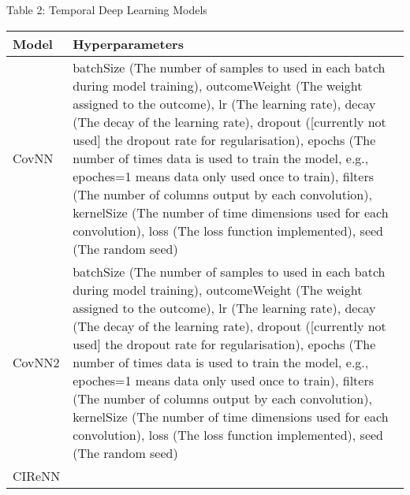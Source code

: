 \documentclass[]{article}
\begin{document}
Table 2: Temporal Deep Learning Models

\begin{longtable}[]{@{}ll@{}}
\toprule
\begin{minipage}[b]{0.12\columnwidth}\raggedright\strut
Model\strut
\end{minipage} & \begin{minipage}[b]{0.82\columnwidth}\raggedright\strut
Hyperparameters\strut
\end{minipage}\tabularnewline
\midrule
\endhead
\begin{minipage}[t]{0.12\columnwidth}\raggedright\strut
CovNN\strut
\end{minipage} & \begin{minipage}[t]{0.82\columnwidth}\raggedright\strut
batchSize (The number of samples to used in each batch during model
training), outcomeWeight (The weight assigned to the outcome), lr (The
learning rate), decay (The decay of the learning rate), dropout
({[}currently not used{]} the dropout rate for regularisation), epochs
(The number of times data is used to train the model, e.g., epoches=1
means data only used once to train), filters (The number of columns
output by each convolution), kernelSize (The number of time dimensions
used for each convolution), loss (The loss function implemented), seed
(The random seed)\strut
\end{minipage}\tabularnewline
\begin{minipage}[t]{0.12\columnwidth}\raggedright\strut
CovNN2\strut
\end{minipage} & \begin{minipage}[t]{0.82\columnwidth}\raggedright\strut
batchSize (The number of samples to used in each batch during model
training), outcomeWeight (The weight assigned to the outcome), lr (The
learning rate), decay (The decay of the learning rate), dropout
({[}currently not used{]} the dropout rate for regularisation), epochs
(The number of times data is used to train the model, e.g., epoches=1
means data only used once to train), filters (The number of columns
output by each convolution), kernelSize (The number of time dimensions
used for each convolution), loss (The loss function implemented), seed
(The random seed)\strut
\end{minipage}\tabularnewline
\begin{minipage}[t]{0.12\columnwidth}\raggedright\strut
CIReNN\strut
\end{minipage} & \begin{minipage}[t]{0.82\columnwidth}\raggedright\strut

\end{minipage}
\end{longtable}
\end{document}
